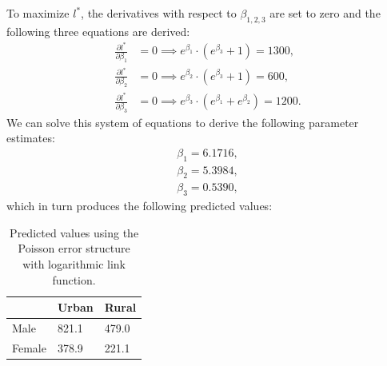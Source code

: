 \documentclass{article}
\begin{document}
To maximize $l^*$, the derivatives with respect to $\beta_{1,2,3}$ are set to zero and the following three equations are derived:
\begin{align}
    \frac{\partial l^*}{\partial\beta_1} &= 0 \implies e^{\beta_1}\cdot(e^{\beta_3}+1) = 1300,\\
    \frac{\partial l^*}{\partial\beta_2} &= 0 \implies e^{\beta_2}\cdot(e^{\beta_3}+1) = 600,\\
    \frac{\partial l^*}{\partial\beta_3} &= 0 \implies e^{\beta_3}\cdot(e^{\beta_1}+e^{\beta_2}) = 1200.
\end{align}
We can solve this system of equations to derive the following parameter estimates:
\begin{align}
    \beta_1 = 6.1716, \\
    \beta_2 = 5.3984, \\
    \beta_3 = 0.5390,
\end{align}
which in turn produces the following predicted values:
\begin{table}[H]
\centering
\begin{tabular}{l|l|l|}
\cline{2-3}
                             & Urban & Rural \\ \hline
\multicolumn{1}{|l|}{Male}   & 821.1   & 479.0   \\ \hline
\multicolumn{1}{|l|}{Female} & 378.9   & 221.1   \\ \hline
\end{tabular}
    \caption{Predicted values using the Poisson error structure with logarithmic link function.}
    \label{fig:covariances_example_2}
\end{table}
\end{document}
